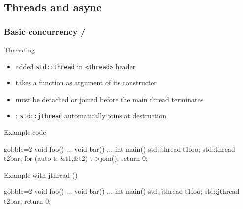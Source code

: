 \subsection[thr]{Threads and async}

\begin{frame}[fragile]
  \frametitle{Basic concurrency \hfill {}/}
  \begin{block}{Threading}
    \begin{itemize}
    \item {} added \texttt{std::thread} in \texttt{<thread>} header
    \item takes a function as argument of its constructor
    \item must be detached or joined before the main thread terminates
    \item {}: \texttt{std::jthread} automatically joins at destruction
    \end{itemize}
  \end{block}
  \vspace{-1\baselineskip}
  \begin{overprint}
    \begin{exampleblock}{Example code}
      \begin{cppcode*}{gobble=2}
        void foo() {...}
        void bar() {...}
        int main() {
          std::thread t1{foo};
          std::thread t2{bar};
          for (auto t: {&t1,&t2}) t->join();
          return 0;
        }
      \end{cppcode*}
    \end{exampleblock}
    \begin{exampleblock}{Example with jthread ()}
      \begin{cppcode*}{gobble=2}
        void foo() {...}
        void bar() {...}
        int main() {
          std::jthread t1{foo};
          std::jthread t2{bar};
          return 0;
        }
      \end{cppcode*}
    \end{exampleblock}
  \end{overprint}
\end{frame}

